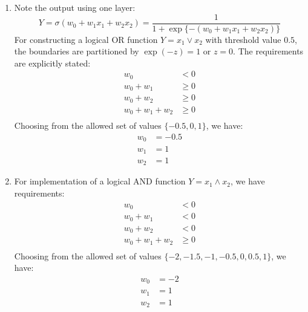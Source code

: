 \documentclass[a4paper, 10pt]{article}
\begin{document}
\begin{enumerate}[label=(\alph*)]
    \item Note the output using one layer:
    \begin{equation}
        Y = \sigma\left(w_0 + w_1 x_1 + w_2 x_2\right) = \frac{1}{1 + \exp\{-(w_0 + w_1 x_1 + w_2 x_2)\}}
    \end{equation}
    For constructing a logical OR function $Y = x_1 \vee x_2$ with threshold value $0.5$, the boundaries are partitioned by $\exp(-z) = 1$ or $z = 0$. The requirements are explicitly stated:
    \begin{equation}
        \begin{aligned}
            w_0 &< 0 \\ 
            w_0 + w_1 &\geq 0  \\
            w_0 + w_2 &\geq 0  \\
            w_0 + w_1 + w_2 &\geq 0  \\
        \end{aligned}
    \end{equation}
    Choosing from the allowed set of values $\{-0.5, 0, 1\}$, we have:
    \begin{equation}
        \begin{aligned}
            w_0 &= -0.5 \\
            w_1 &= 1 \\ 
            w_2 &= 1
        \end{aligned}
    \end{equation}
    
    \item For implementation of a logical AND function $Y = x_1 \wedge x_2$, we have requirements:
    \begin{equation}
        \begin{aligned}
            w_0 &< 0 \\ 
            w_0 + w_1 &< 0 \\
            w_0 + w_2 &< 0 \\
            w_0 + w_1 + w_2 &\geq 0 \\
        \end{aligned}
    \end{equation}
    Choosing from the allowed set of values $\{-2, -1.5, -1, -0.5, 0, 0.5, 1\}$, we have:
    \begin{equation}
        \begin{aligned}
            w_0 &= -2 \\ 
            w_1 &= 1 \\ 
            w_2 &= 1
        \end{aligned}
    \end{equation}
\end{enumerate}
\end{document}
